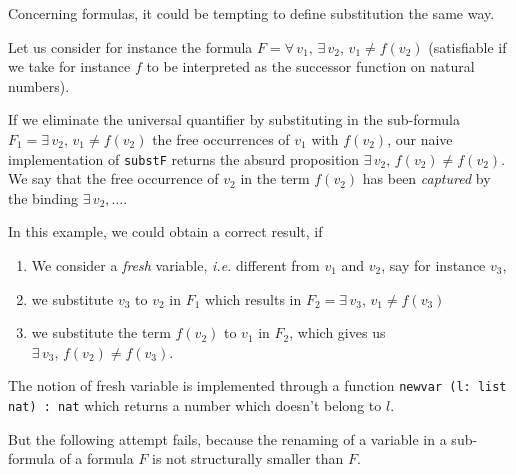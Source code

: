 

Concerning formulas, it could be tempting to define substitution the same way.

Let us consider for instance the formula $F = \forall\,v_1, \,\exists\,v_2,\,v_1\not=f(v_2)$ (satisfiable if we take for instance $f$ to be interpreted as the successor function on natural numbers).

If we eliminate the universal quantifier by substituting in
the sub-formula $F_1=  \exists\,v_2,\,v_1\not=f(v_2)$ the free
occurrences of $v_1$ with $f(v_2)$, our naive implementation of
\texttt{substF} returns the absurd proposition $\exists\,v_2,\,f(v_2)\not=f(v_2)$. We  say that the free occurrence of $v_2$ in the term $f(v_2)$ has been \emph{captured} by the binding $\exists\,v_2,\dots$.


In this example, we could obtain a correct result, if
\begin{enumerate}
\item We consider a \emph{fresh} variable, \emph{i.e.}  different from $v_1$ and $v_2$, say for instance $v_3$,
\item we substitute $v_3$ to $v_2$ in $F_1$ which results in
   $F_2= \exists\,v_3,\,v_1\not=f(v_3)$
\item we substitute the term $f(v_2)$ to $v_1$ in $F_2$, which gives us 
  $\exists\,v_3,\,f(v_2)\not=f(v_3)$.
\end{enumerate}

The notion of fresh variable is implemented through a function
\texttt{newvar (l: list nat) : nat} which returns a number which doesn't belong to $l$.

But the following attempt fails, because the renaming of a  variable in a 
sub-formula of a formula $F$ is not structurally smaller than $F$.







